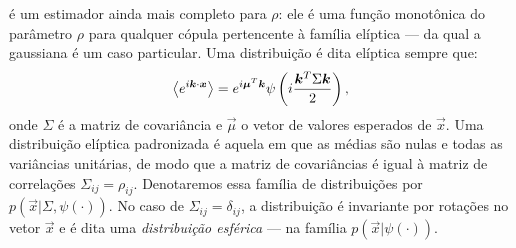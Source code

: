  é um estimador ainda mais completo para $\rho$: ele é uma função monotônica do parâmetro $\rho$ para qualquer cópula pertencente à família elíptica --- da qual a gaussiana é um caso particular. Uma distribuição é dita elíptica sempre que: 
\begin{equation}
\label{eq:eliptical}
\avg{e^{i\vec{k}\cdot\vec{x}} } = e^{i\vec{\mu}^{T}\vec{k}} \psi\left(i\frac{\vec{k}^{T}\Sigma\vec{k}}{2}\right),
\end{equation}
onde $\Sigma$ é a matriz de covariância e $\vec{\mu}$ o vetor de valores esperados de $\vec{x}$. Uma distribuição elíptica padronizada é aquela em que as médias são nulas e todas as variâncias unitárias, de modo que a matriz de covariâncias é igual à matriz de correlações $\Sigma_{ij} = \rho_{ij}$. Denotaremos essa família de distribuições por $p(\vec{x} | \Sigma, \psi(\cdot))$. No caso de $\Sigma_{ij} = \delta_{ij}$, a distribuição é invariante por rotações no vetor $\vec{x}$ e é dita uma \textit{distribuição esférica} --- na família 
$p(\vec{x} | \psi(\cdot))$. 

